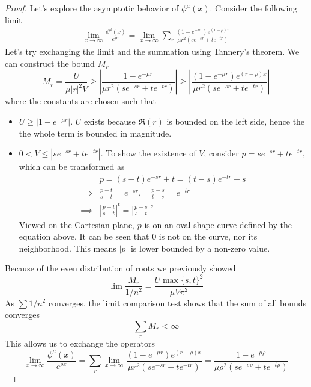 \documentclass[]{article}
\begin{document}
\begin{proof}
Let's explore the asymptotic behavior of $\phi^{\mu}(x)$. Consider the following limit
\begin{align*}
\lim_{x\to\infty}\frac{\phi^{\mu}(x)}{e^{\rho x}} = \lim_{x\to\infty}\sum_{r} \frac{(1-e^{-\mu r})e^{(r-\rho)x}}{\mu r^2(se^{-sr}+te^{-tr})}
\end{align*}
Let's try exchanging the limit and the summation using Tannery's theorem. We can construct the bound $M_r$
\[
M_r = \frac{U}{\mu |r|^2 V}\ge \left| \frac{1-e^{-\mu r}}{\mu r^2(se^{-sr}+te^{-tr})} \right| \ge \left| \frac{(1-e^{-\mu r})e^{(r-\rho)x}}{\mu r^2(se^{-sr}+te^{-tr})} \right|
\]
where the constants are chosen such that
\begin{itemize}
	\item $U \ge |1-e^{-\mu r}|$. $U$ exists because $\Re(r)$ is bounded on the left side, hence the the whole term is bounded in magnitude.
	\item $0 < V \le |se^{-sr}+te^{-tr}|$. To show the existence of $V$, consider $p = se^{-sr}+te^{-tr}$, which can be transformed as
	\begin{align*}
	&p = (s-t)e^{-sr} + t = (t-s)e^{-tr} + s\\
	\implies& \frac{p-t}{s-t} = e^{-sr}, \quad \frac{p-s}{t-s} = e^{-tr}\\
	\implies& \left|\frac{p-t}{s-t}\right|^t = \left|\frac{p-s}{s-t}\right|^s
	\end{align*}
	Viewed on the Cartesian plane, $p$ is on an oval-shape curve defined by the equation above. It can be seen that $0$ is not on the curve, nor its neighborhood. This means $|p|$ is lower bounded by a non-zero value.
\end{itemize}
Because of the even distribution of roots we previously showed
\[
	\lim \frac{M_r}{1/n^2} = \frac{U \max\{s,t\}^2}{\mu V \pi^2}
\]
As $\sum 1/n^2$ converges, the limit comparison test shows that the sum of all bounds converges
\[
\sum_{r} M_r < \infty
\]
This allows us to exchange the operators
\[
\lim_{x\to\infty}\frac{\phi^{\mu}(x)}{e^{\rho x}} =\sum_{r}  \lim_{x\to\infty}\frac{(1-e^{-\mu r})e^{(r-\rho)x}}{\mu r^2(se^{-sr}+te^{-tr})} = \frac{1-e^{-\mu \rho}}{\mu \rho^2(se^{-s\rho}+te^{-t\rho})}
\]


\end{proof}
\end{document}
